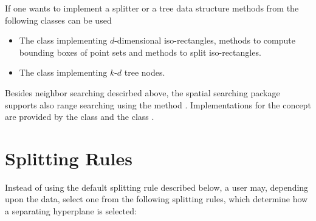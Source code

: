 If one wants to implement a splitter or a tree data structure
methods from the following classes can be used

\begin{itemize}

\item
The class  implementing $d$-dimensional iso-rectangles, 
methods to compute bounding boxes
of point sets and methods to split iso-rectangles.

\item
The class  implementing $k$-$d$ tree nodes.

\end{itemize}

Besides neighbor searching descirbed above, the spatial searching package
supports also range searching using the method 
.
Implementations for the concept  are provided by
the class   
and the class . 

\section{Splitting Rules}
\label{Spatial_Searching:Splitting_rule_section}

Instead of using the default splitting rule  described below,
a user may, depending upon the data, select 
one from the following splitting rules,
which determine how a separating hyperplane is selected:

